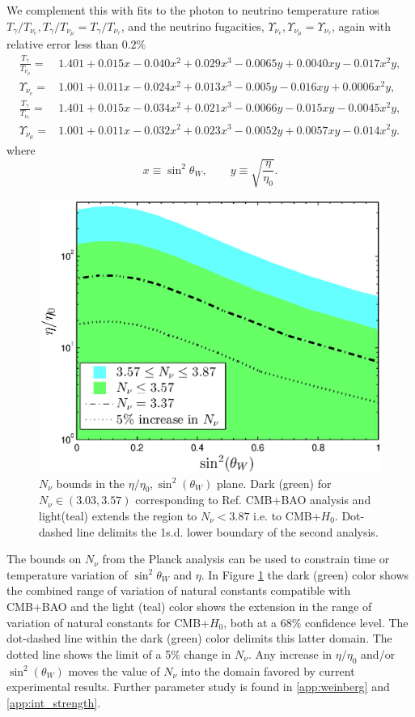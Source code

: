 We complement this with fits to the photon to neutrino temperature ratios $ T_\gamma / T_{\nu_e}, T_\gamma / T_{\nu_\mu}= T_\gamma / T_{\nu_\tau} $, and the neutrino fugacities, $\Upsilon_{\nu_e}, \Upsilon_{\nu_\mu}=\Upsilon_{\nu_\tau}$, again with relative error less than $0.2\%$  
\begin{align}
\frac{T_\gamma}{T_{\nu_\mu}}=&1.401+0.015x-0.040x^2+0.029x^3-0.0065y+0.0040xy-0.017x^2y, \label{fit1}\\
\Upsilon_{\nu_e}=&1.001+0.011x-0.024x^2+0.013x^3-0.005y-0.016xy+0.0006x^2y,\label{fit2}\\ 
\frac{T_\gamma}{T_{\nu_e}}=&1.401+0.015x-0.034x^2+0.021x^3-0.0066y-0.015xy-0.0045x^2y,\label{fit3}\\
\Upsilon_{\nu_\mu}=&1.001+0.011x-0.032x^2+0.023x^3-0.0052y+0.0057xy-0.014x^2y.\label{fit4}
\end{align}
where
\begin{equation}%
x\equiv \sin^2 \theta_W ,\qquad
y\equiv  \sqrt{\frac{\eta}{\eta_0}}.
\end{equation}%

\begin{figure}%
\centerline{\includegraphics[width=0.75\columnwidth]{04-birrell/ParametricStudies/region_plot_legend.eps}
}
\caption{$N_\nu$ bounds in the $\eta/\eta_0, \sin^2(\theta_W)$ plane. Dark (green) for $N_\nu\in (3.03,3.57)$ corresponding to Ref.\cite{Planck} CMB+BAO analysis and light(teal) extends the region to $N_\nu<3.87$ i.e. to CMB+$H_0$. Dot-dashed line delimits the 1s.d. lower boundary of the second analysis.}
\label{N_nu_domain}
 \end{figure}
The bounds on $N_\nu$ from the Planck analysis \cite{Planck} can be  used to constrain time or temperature variation of $\sin^2\theta_W$ and $\eta$.  
In  Figure \ref{N_nu_domain} the dark (green) color shows the combined range of  variation of natural constants  compatible with CMB+BAO and the light (teal) color shows  the extension in the range of  variation of  natural constants for CMB+$H_0$, both at a $68\%$ confidence level. The dot-dashed line within the dark (green) color  delimits   this latter domain. The dotted line shows the limit of a 5\% change in $N_\nu$.    Any increase in  $\eta/\eta_0$ and/or $\sin^2(\theta_W)$ moves the value of $N_\nu$ into the domain favored by current experimental results. Further parameter study is found in \ref{app:weinberg} and \ref{app:int_strength}.

